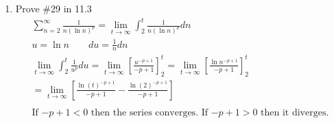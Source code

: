\documentclass[12pt]{article}
\begin{document}
\begin{enumerate}
\begin{enumerate}
    \end{enumerate}
    \newpage\item Prove \#29 in 11.3
    \begin{gather*}
        \sum^\infty_{n=2}\frac{1}{n(\ln n)^p}=\lim_{t\to\infty}\int_2^t\frac{1}{n(\ln{n})^p}dn
        \\u = \ln n \quad\quad du = \frac{1}{n}dn
        \\ \lim_{t\to\infty}\int_2^t\frac{1}{u^p}du=\lim_{t\to\infty}\left[\frac{u^{-p+1}}{-p+1}\right]_2^t=\lim_{t\to\infty}\left[\frac{\ln  n^{-p+1}}{-p+1}\right]_2^t
        \\=\lim_{t\to\infty}\left[\frac{\ln  (t)^{-p+1}}{-p+1}-\frac{\ln{(2)^{-p+1}}}{-p+1}\right]
        \\\\\text{If $-p+1 < 0$ then the series converges. If $-p+1 > 0$ then it diverges.}
    \end{gather*}
\end{enumerate}
\end{document}
